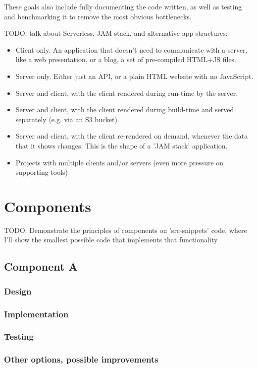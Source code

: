\documentclass[english,odsaz]{fitthesis}
\begin{document}
These goals also include fully documenting the code written, as well as testing
and benchmarking it to remove the most obvious bottlenecks.

TODO: talk about Serverless, JAM stack, and alternative app structures:
\begin{itemize}
\item Client only. An application that doesn't need to communicate with a server,
like a web presentation, or a blog, a set of pre-compiled HTML+JS files.
\item Server only. Either just an API, or a plain HTML website with no JavaScript.
\item Server and client, with the client rendered during run-time by the server.
\item Server and client, with the client rendered during build-time and served
separately (e.g. via an S3 bucket).
\item Server and client, with the client re-rendered on demand, whenever the data that
it shows changes. This is the shape of a 'JAM stack' application.
\item Projects with multiple clients and/or servers (even more pressure on
supporting tools)
\end{itemize}

\chapter{Components}
\label{sec:org8a5b091}
TODO: Demonstrate the principles of components on 'src-snippets' code, where
I'll show the smallest possible code that implements that functionality

\section{Component A}
\label{sec:orgb786ab8}
\subsection{Design}
\label{sec:orge19c543}
\subsection{Implementation}
\label{sec:org253c664}
\subsection{Testing}
\label{sec:org1f810eb}
\subsection{Other options, possible improvements}
\label{sec:org5b8ffb9}
\end{document}
